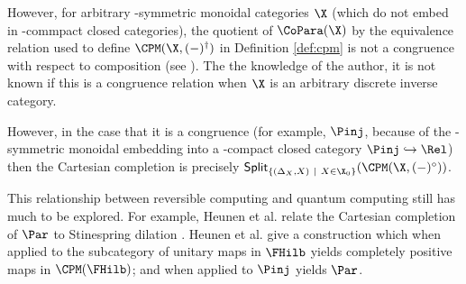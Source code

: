 However, for arbitrary \dag-symmetric monoidal categories $\X$ (which do not embed in \dag-commpact closed categories), the quotient of $\CoPara(\X)$ by the equivalence relation used to define  $\CPM(\X,(-)^\dag)$ in Definition \ref{def:cpm} is not a congruence with respect to composition (see \cite[Remark 8]{coecke2016pictures}).  The the knowledge of the author, it is not known if this is a congruence relation when $\X$ is an arbitrary discrete inverse category.




However, in the case that it is a congruence (for example, $\Pinj$, because of the \dag-symmetric monoidal embedding into a \dag-compact closed category $\Pinj\hookrightarrow\Rel$) then the Cartesian completion is precisely  ${\sf Split}_{\{(\Delta_X,X)\ | \ X \in \X_0 \}}(\CPM(\X,(-)^\circ))$.


This relationship between reversible computing and quantum computing still has much to be explored.  For example, Heunen et al. relate the Cartesian completion of $\Par$ to Stinespring dilation \cite{Kaarsgaard}. Heunen et al. give a construction which when applied to the subcategory of unitary maps in $\FHilb$  yields completely positive maps in $\CPM(\FHilb)$; and when applied to $\Pinj$ yields $\Par$.

